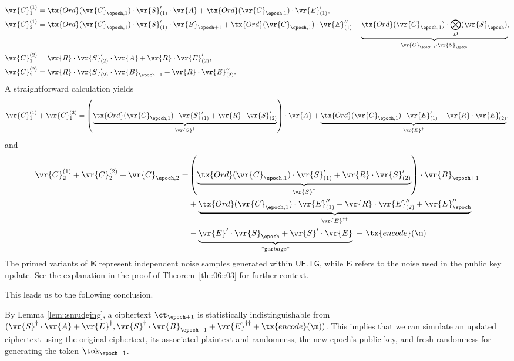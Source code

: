 \documentclass{fundam}
\begin{document}
\begin{align*}
	 \vr{C}_{1}^{(1)} &= \tx{Ord}(\vr{C}_{\epoch , 1})\cdot\vr{S}_{(1)}'  \cdot \vr{A} + \tx{Ord}(\vr{C}_{\epoch , 1})\cdot \vr{E}_{(1)}' ,     \\
	 \vr{C}_{2}^{(1)} &=   \tx{Ord}(\vr{C}_{\epoch , 1})\cdot \vr{S}_{(1)}' \cdot \vr{B}_{\epoch+1} + \tx{Ord}(\vr{C}_{\epoch , 1})\cdot \vr{E}_{(1)}''  -   \underbrace{\tx{Ord}(\vr{C}_{\epoch , 1})\cdot \bigotimes_{D} (\vr{S}_{\epoch}) }_{\vr{C}_{\epoch , 1}\cdot \vr{S}_{\epoch}}, \\
	 	\vr{C}_{1}^{(2)} &= \vr{R}\cdot \vr{S}_{(2)}' \cdot \vr{A} + \vr{R}\cdot \vr{E}_{(2)}'  ,\\
	 \vr{C}_{2}^{(2)} &= \vr{R}\cdot \vr{S}_{(2)}' \cdot \vr{B}_{\epoch+1} + \vr{R}\cdot \vr{E}_{(2)}''.
\end{align*}
A straightforward calculation yields
\begin{align*}
 \vr{C}_{1}^{(1)} + \vr{C}_{1}^{(2)}  = \left(  \underbrace{\tx{Ord}(\vr{C}_{\epoch , 1})\cdot \vr{S}_{(1)}'  +  \vr{R}\cdot \vr{S}_{(2)}' }_{\vr{S}^{\dagger}}  \right) \cdot \vr{A}  + \underbrace{\tx{Ord}(\vr{C}_{\epoch , 1})\cdot \vr{E}_{(1)}' + \vr{R}\cdot \vr{E}_{(2)}' }_{\vr{E}^{\dagger}} ,
\end{align*}
and
\begin{align*}
 \vr{C}_{2}^{(1)}  +  \vr{C}_{2}^{(2)}  + \vr{C}_{\epoch,2}  = & \left(  \underbrace{\tx{Ord}(\vr{C}_{\epoch , 1})\cdot \vr{S}_{(1)}'  +  \vr{R}\cdot \vr{S}_{(2)}' }_{\vr{S}^{\dagger}}  \right) \cdot \vr{B}_{\epoch+1} \\
 & + \underbrace{\tx{Ord}(\vr{C}_{\epoch , 1})\cdot \vr{E}_{(1)}'' + \vr{R}\cdot \vr{E}_{(2)}'' +\vr{E}_{\epoch}''}_{\vr{E}^{\dagger\dagger}} \\
 &- \underbrace{\vr{E}'\cdot \vr{S}_{\epoch} + \vr{S}' \cdot \vr{E}}_{\text{''garbage''}}~ +  ~\tx{encode}(\m)
\end{align*}
%
The primed variants of $\mathbf{E}$ represent independent noise samples generated within $\mathsf{UE.TG}$, while $\mathbf{E}$ refers to the noise used in the public key update. See the explanation in the proof of Theorem~\ref{th::06::03} for further context.

\vspace{0.3cm}
\noindent This leads us to the following conclusion.
\begin{concl}\label{conc::01}
	By Lemma \ref{lem::smudging},  a ciphertext $\ct_{\epoch+1}$ is statistically indistinguishable from $(\vr{S}^{\dagger}\cdot\vr{A} + \vr{E}^{\dagger},  \vr{S}^{\dagger}\cdot\vr{B}_{\epoch+1} + \vr{E}^{\dagger\dagger} +  \tx{encode}(\m))$. This implies that we can simulate an updated ciphertext using the original ciphertext, its associated plaintext and randomness, the new epoch's public key, and fresh randomness for generating the token $\tok_{\epoch+1}$.
\end{concl}
\end{document}
